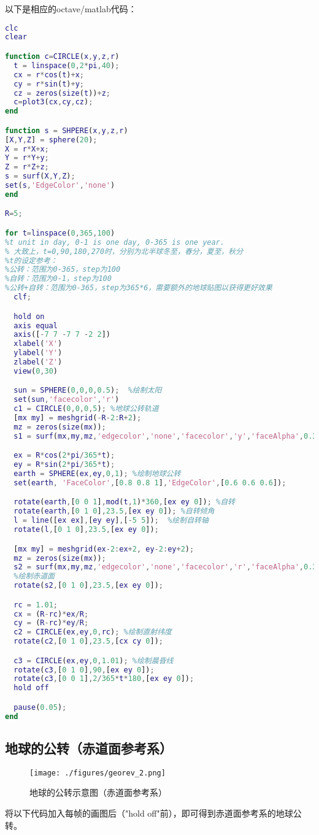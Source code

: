 以下是相应的octave/matlab代码：
\begin{lstlisting}[language=matlab]
clc
clear

function c=CIRCLE(x,y,z,r)
  t = linspace(0,2*pi,40);
  cx = r*cos(t)+x;
  cy = r*sin(t)+y;
  cz = zeros(size(t))+z;
  c=plot3(cx,cy,cz);
end

function s = SHPERE(x,y,z,r)
[X,Y,Z] = sphere(20);
X = r*X+x;
Y = r*Y+y;
Z = r*Z+z;
s = surf(X,Y,Z);
set(s,'EdgeColor','none')
end

R=5;

for t=linspace(0,365,100)
%t unit in day, 0-1 is one day, 0-365 is one year.
% 大致上，t=0,90,180,270时，分别为北半球冬至，春分，夏至，秋分
%t的设定参考：
%公转：范围为0-365，step为100
%自转：范围为0-1，step为100
%公转+自转：范围为0-365，step为365*6，需要额外的地球贴图以获得更好效果
  clf;

  hold on
  axis equal
  axis([-7 7 -7 7 -2 2])
  xlabel('X')
  ylabel('Y')
  zlabel('Z')
  view(0,30)

  sun = SPHERE(0,0,0,0.5);  %绘制太阳
  set(sun,'facecolor','r')
  c1 = CIRCLE(0,0,0,5); %地球公转轨道
  [mx my] = meshgrid(-R-2:R+2);
  mz = zeros(size(mx));
  s1 = surf(mx,my,mz,'edgecolor','none','facecolor','y','faceAlpha',0.3); %黄道面

  ex = R*cos(2*pi/365*t);
  ey = R*sin(2*pi/365*t);
  earth = SPHERE(ex,ey,0,1); %绘制地球公转
  set(earth, 'FaceColor',[0.8 0.8 1],'EdgeColor',[0.6 0.6 0.6]);

  rotate(earth,[0 0 1],mod(t,1)*360,[ex ey 0]); %自转
  rotate(earth,[0 1 0],23.5,[ex ey 0]); %自转倾角
  l = line([ex ex],[ey ey],[-5 5]);  %绘制自转轴
  rotate(l,[0 1 0],23.5,[ex ey 0]);

  [mx my] = meshgrid(ex-2:ex+2, ey-2:ey+2);
  mz = zeros(size(mx));
  s2 = surf(mx,my,mz,'edgecolor','none','facecolor','r','faceAlpha',0.3);
  %绘制赤道面
  rotate(s2,[0 1 0],23.5,[ex ey 0]);

  rc = 1.01;
  cx = (R-rc)*ex/R;
  cy = (R-rc)*ey/R;
  c2 = CIRCLE(ex,ey,0,rc); %绘制直射纬度
  rotate(c2,[0 1 0],23.5,[cx cy 0]);

  c3 = CIRCLE(ex,ey,0,1.01); %绘制晨昏线
  rotate(c3,[0 1 0],90,[ex ey 0]);
  rotate(c3,[0 0 1],2/365*t*180,[ex ey 0]);
  hold off

  pause(0.05);
end
\end{lstlisting}

\subsection{地球的公转（赤道面参考系）}
\begin{figure}[ht]
\centering
\texttt{[image: ./figures/georev\_2.png]}
\caption{地球的公转示意图（赤道面参考系）} \label{georev_fig2}
\end{figure}
将以下代码加入每帧的画图后（"hold off"前），即可得到赤道面参考系的地球公转。

